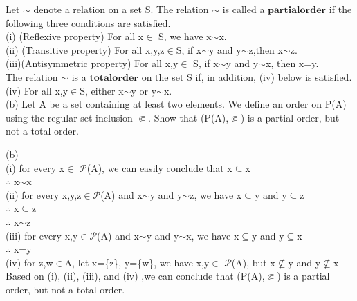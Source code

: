 \documentclass[11pt, a4paper, UTF8]{ctexart}
\begin{document}
\begin{problem}[UD:12.13b]
Let $\sim$ denote a relation on a set S. The relation $\sim$ is called a $\boldsymbol{partial order}$ if the following three conditions are satisfied.\\
(i) (Reflexive property) For all x$\in$ S, we have x$\sim$x.\\
(ii) (Transitive property) For all x,y,z$\in$S, if x$\sim$y and y$\sim$z,then x$\sim$z.\\
(iii)(Antisymmetric property) For all x,y$\in$ S, if x$\sim$y and y$\sim$x, then x=y.\\
The relation $\sim$ is a $\boldsymbol{total order}$ on the set S if, in addition, (iv) below is satisfied.\\
(iv) For all x,y$\in$S, either x$\sim$y or y$\sim$x.\\
(b) Let A be a set containing at least two elements. We define an order on P(A) using the regular set inclusion $\Subset$. Show that (P(A),$\Subset$) is a partial order, but not a total order.
\end{problem}
\begin{solution}
(b)\\
(i) for every x$\in$ $\mathcal{P}$(A), we can easily conclude that x$\subseteq$x\\
$\therefore$ x$\sim$x\\
(ii) for every x,y,z$\in$$\mathcal{P}$(A) and x$\sim$y and y$\sim$z, we have x$\subseteq$y and y$\subseteq$z\\
$\therefore$ x$\subseteq$z\\
$\therefore$ x$\sim$z\\
(iii) for every x,y$\in$$\mathcal{P}$(A) and x$\sim$y and y$\sim$x, we have x$\subseteq$y and y$\subseteq$x\\
$\therefore$ x=y\\
(iv) for z,w$\in$A, let x=\{z\}, y=\{w\}, we have x,y$\in$ $\mathcal{P}$(A), but x$\nsubseteq$y and y$\nsubseteq$x\\
Based on (i), (ii), (iii), and (iv) ,we can conclude that (P(A),$\Subset$) is a partial order, but not a total order.\\
\end{solution}
\end{document}
